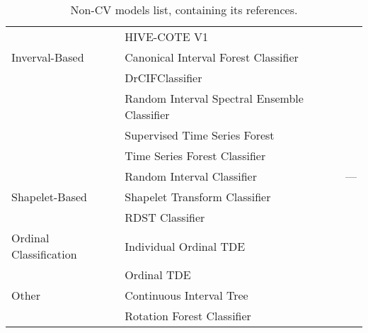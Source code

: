 \begin{table}
{\begin{tabular}{llc}
 					& HIVE-COTE V1				& \cite{HIVECOTEV2}		\\
 		Inverval-Based		& Canonical Interval Forest Classifier	& \cite{CanonicalIntervalForestClassifier}\\
 					& DrCIFClassifier			& \cite{HIVECOTEV2}		\\
 			& Random Interval Spectral Ensemble Classifier & \cite{RandomIntervalSpectralEnsembleClassifier}\\
 					& Supervised Time Series Forest		& \cite{SupervisedTimeSeriesForest}\\
 					& Time Series Forest Classifier		& \cite{TimeSeriesForestClassifier}\\
 					& Random Interval Classifier		& ---				\\
 		Shapelet-Based		& Shapelet Transform Classifier		& \cite{ShapeletTransformClassifier-1}\cite{ShapeletTransformClassifier-2}\\
 					& RDST Classifier			& \cite{RDSTClassifier-1}\cite{RDSTClassifier-2}\\
 		Ordinal Classification	& Individual Ordinal TDE		& \cite{OrdinalTDE}		\\
 					& Ordinal TDE				& \cite{OrdinalTDE}		\\
 		Other			& Continuous Interval Tree		& \cite{ContinuousIntervalTree}	\\
 					& Rotation Forest Classifier		& \cite{RotationForestClassifier}\\
		\bottomrule
	\end{tabular}
	}
	\caption{Non-\acrlong{CV} models list, containing its references.}
	\label{tab:non_cv_list}
\end{table}
